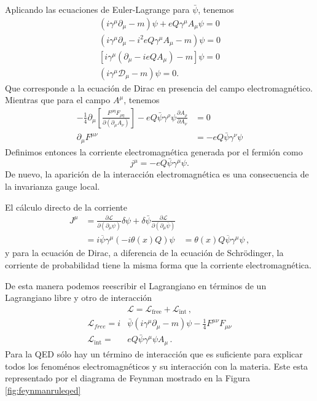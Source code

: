 Aplicando las ecuaciones de Euler-Lagrange para $\bar{\psi}$, tenemos
\begin{align}
  (i\gamma^\mu\partial_\mu-m)\psi+eQ\gamma^\mu A_\mu\psi=0\nonumber\\
  (i\gamma^\mu\partial_\mu-i^2eQ\gamma^\mu A_\mu-m)\psi=0\nonumber\\
  [i\gamma^\mu(\partial_\mu-ieQA_\mu)-m]\psi=0\nonumber\\
  (i\gamma^\mu\mathcal{D}_\mu-m)\psi=0.
\end{align}
Que corresponde a la ecuación de Dirac en presencia del campo electromagnético. Mientras que para el campo $A^\mu$, tenemos
\begin{align}
  -\frac{1}{4}\partial_\mu\left[\frac{F^{\rho\eta}F_{\rho\eta}}{\partial\left(\partial_\mu A_\nu\right)}\right]-eQ\bar{\psi}\gamma^\rho\psi\frac{\partial A_\rho}{\partial A_\nu}&=0\nonumber\\
  \partial_\mu F^{\mu\nu}&=-eQ\bar{\psi}\gamma^\nu\psi
\end{align}
Definimos entonces la corriente electromagnética generada por el fermión como
\begin{equation}
  \label{eq:222qft}
  j^\mu=-eQ\bar{\psi}\gamma^\mu\psi.
\end{equation}
De nuevo, la aparición de la interacción electromagnética es una consecuencia de la invarianza gauge local. 

El cálculo directo de la  corriente 
\begin{align}
  J^\mu&=\frac{\partial\mathcal{L}}{\partial\left(\partial_\mu\psi\right)}\delta\psi+\delta\bar{\psi}\frac{\partial\mathcal{L}}{\partial\left(\partial_\mu\bar{\psi}\right)}\nonumber\\
  &= i\overline{\psi}\gamma^\mu(-i \theta(x) Q ) \psi
  &= \theta(x) Q\overline{\psi}\gamma^\mu \psi\,,
\end{align}
y para la ecuación de Dirac, a diferencia de la ecuación de Schrödinger, la corriente de probabilidad tiene la misma forma que la corriente electromagnética.


De esta manera podemos reescribir el Lagrangiano en términos de un Lagrangiano libre y otro de interacción
\begin{align}
  \mathcal{L}=\mathcal{L}_{\text{free}}+\mathcal{L}_{\text{int}}\,,
\end{align}
\begin{align}
  \mathcal{L}_{free}=i&\bar{\psi}\left(i\gamma^\mu\partial_\mu-m\right)\psi-\tfrac{1}{4}F^{\mu\nu}F_{\mu\nu}\nonumber\\
  \mathcal{L}_{\text{int}}=&eQ\bar{\psi}\gamma^\mu\psi A_\mu\,.
\end{align}
Para la QED sólo hay un término de interacción que es suficiente para explicar todos los fenoménos electromagnéticos y su interacción con la materia. Este esta representado por el diagrama de Feynman mostrado en la Figura \ref{fig:feynmanruleqed}

